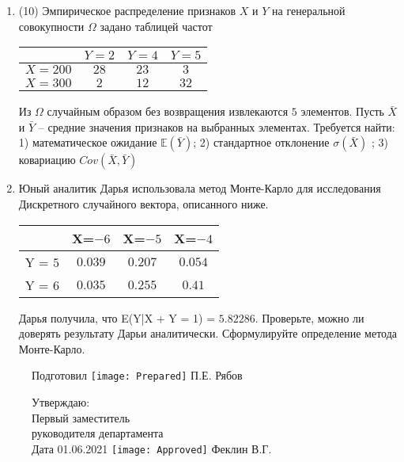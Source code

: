 \documentclass[a4paper,10pt]{article}
\begin{document}
\begin{enumerate}
\item


(10) Эмпирическое распределение признаков $X$ и $Y$ на генеральной совокупности $\Omega$ задано таблицей частот  
 
\begin{tabular}{ | c | c | c | c | }
\hline
 & $Y = 2$ & $Y = 4$ & $Y = 5$  \\ \hline
$X = 200$ & $28$ & $23$ & $3$\\ \hline
$X = 300$ & $2$ & $12$ & $32$\\
\hline
\end{tabular}

Из $\Omega$ случайным образом без возвращения извлекаются $5$ элементов. 
Пусть $\bar X$ и $\bar Y$ – средние значения признаков на выбранных элементах. 
Требуется найти: 1) математическое ожидание $\mathbb{E}(\bar Y)$; 2) стандартное отклонение $\sigma(\bar X)$ ; 
3) ковариацию $Cov(\bar X, \bar Y)$


\item

    
    	Юный аналитик Дарья использовала метод Монте-Карло для исследования Дискретного случайного вектора, описанного ниже.

        \begin{tabular}{|c|c|c|c|}
	\hline
	& X=$-6$ & X=$-5$ & X=$-4$ \\
	\hline
	Y = $5$ & $0.039$ & $0.207$  &  $0.054$ \\
	\hline
	Y = $6$ & $0.035$ & $0.255$ & $0.41$  \\
	\hline
\end{tabular}

    	Дарья получила, что E(Y|X + Y = 1) = $5.82286$.
    	Проверьте, можно ли доверять результату Дарьи аналитически. Сформулируйте определение метода Монте-Карло.
    

\end{enumerate}

\begin{figure}[H]
	Подготовил
	\hfill
	\texttt{[image: Prepared]}
	П.Е. Рябов
\end{figure}


\begin{figure}[H]
	Утверждаю:\\
	Первый заместитель\\
	руководителя департамента\\
	Дата 01.06.2021
	\hfill
	\texttt{[image: Approved]}
	Феклин В.Г.
\end{figure}
\end{document}
